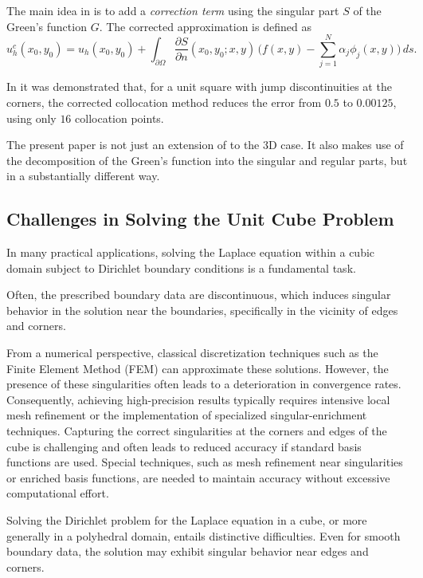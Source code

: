 \documentclass[12pt,oneside,reqno]{amsart}%
\theoremstyle{plain}
\numberwithin{equation}{section}
\begin{document}
The main idea in \cite{Levin1980} is to add a {\em correction term} using the singular part $S$ of the Green’s function
$G$.
The corrected approximation is defined as 
\[
u_h^c(x_0,y_0) 
 = u_h(x_0,y_0) 
   + \int_{\partial\Omega} \frac{\partial S}{\partial n}(x_0,y_0;x,y)\, \big(f(x,y)-\sum_{j=1}^N\alpha_j\phi_j(x,y)\big)\, ds .
\]

In \cite{Levin1980} it was demonstrated that,
for a unit square with jump discontinuities at the corners, the corrected collocation method reduces the error
from $0.5$ to $0.00125$,
using only $16$ collocation points.

The present paper is not just an extension of \cite{Levin1980} to the 3D case. It also makes use of the decomposition of the Green's function into the singular and regular parts, but in a substantially different way.  

\subsection{Challenges in Solving the Unit Cube Problem}\hfill

In many practical applications, 
solving the Laplace equation 
within a cubic domain subject to 
Dirichlet boundary conditions is 
a fundamental task. 

Often, the prescribed boundary data 
are discontinuous, which induces 
singular behavior in the solution 
near the boundaries, specifically 
in the vicinity of edges and corners.

From a numerical perspective, 
classical discretization techniques 
such as the Finite Element Method (FEM) 
can approximate these solutions. 
However, the presence of these 
singularities often leads to a 
deterioration in convergence rates. 
Consequently, achieving high-precision 
results typically requires
intensive local mesh refinement 
or the implementation of specialized 
singular-enrichment techniques. Capturing the correct 
singularities at the corners and edges of the cube is challenging and often leads to 
reduced accuracy if standard basis functions are used. Special techniques, such as 
mesh refinement near singularities or enriched basis functions, are needed to maintain accuracy without excessive computational effort.

Solving the Dirichlet problem for the Laplace equation in a cube,
or more generally in a polyhedral domain,
entails distinctive difficulties.
Even for smooth boundary data,
the solution may exhibit singular behavior near edges and corners.
\end{document}
